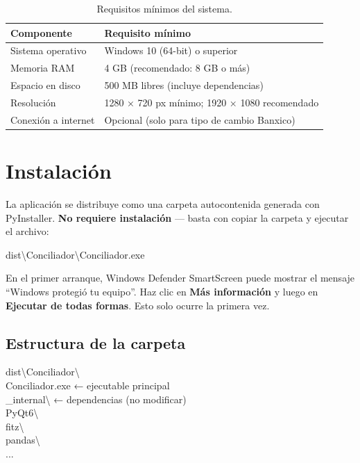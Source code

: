 \documentclass[12pt, a4paper, oneside]{report}
\begin{document}
\begin{table}[H]
  \centering
  \begin{tabularx}{\linewidth}{lX}
    \toprule
    \textbf{Componente} & \textbf{Requisito mínimo} \\
    \midrule
    Sistema operativo & Windows 10 (64-bit) o superior \\
    Memoria RAM       & 4 GB (recomendado: 8 GB o más) \\
    Espacio en disco  & 500 MB libres (incluye dependencias) \\
    Resolución        & 1280 × 720 px mínimo; 1920 × 1080 recomendado \\
    Conexión a internet & Opcional (solo para tipo de cambio Banxico) \\
    \bottomrule
  \end{tabularx}
  \caption{Requisitos mínimos del sistema.}
\end{table}

\section{Instalación}

La aplicación se distribuye como una carpeta autocontenida generada con
PyInstaller. \textbf{No requiere instalación} — basta con copiar la carpeta y
ejecutar el archivo:

\begin{rutabox}
dist\textbackslash{}Conciliador\textbackslash{}Conciliador.exe
\end{rutabox}

\begin{notabox}
En el primer arranque, Windows Defender SmartScreen puede mostrar el mensaje
``Windows protegió tu equipo''. Haz clic en \textbf{Más información} y luego en
\textbf{Ejecutar de todas formas}. Esto solo ocurre la primera vez.
\end{notabox}

\subsection{Estructura de la carpeta}

\begin{rutabox}
dist\textbackslash{}Conciliador\textbackslash{}\\
\hspace{1em}Conciliador.exe          \textcolor{textMuted}{← ejecutable principal}\\
\hspace{1em}\_internal\textbackslash{}             \textcolor{textMuted}{← dependencias (no modificar)}\\
\hspace{2em}PyQt6\textbackslash{}\\
\hspace{2em}fitz\textbackslash{}\\
\hspace{2em}pandas\textbackslash{}\\
\hspace{2em}...
\end{rutabox}
\end{document}
